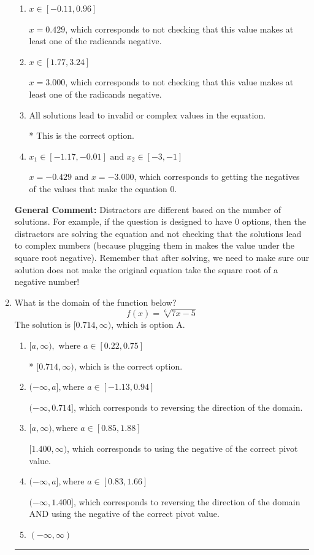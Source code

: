 \documentclass{extbook}[14pt]
\newcommand{\litem}[1]{\item #1

\rule{\textwidth}{0.4pt}}
\begin{document}
\begin{enumerate}
{\begin{enumerate}[label=\Alph*.]
$x = 0.429 \text{ and } x = 3.000$, which corresponds to not checking that BOTH values make at least one of the radicands negative.
\item \( x \in [-0.11,0.96] \)

$x = 0.429$, which corresponds to not checking that this value makes at least one of the radicands negative.
\item \( x \in [1.77,3.24] \)

$x = 3.000$, which corresponds to not checking that this value makes at least one of the radicands negative.
\item \( \text{All solutions lead to invalid or complex values in the equation.} \)

* This is the correct option.
\item \( x_1 \in [-1.17, -0.01] \text{ and } x_2 \in [-3,-1] \)

$x = -0.429 \text{ and } x = -3.000$, which corresponds to getting the negatives of the values that make the equation 0.
\end{enumerate}

\textbf{General Comment:} Distractors are different based on the number of solutions. For example, if the question is designed to have 0 options, then the distractors are solving the equation and not checking that the solutions lead to complex numbers (because plugging them in makes the value under the square root negative). Remember that after solving, we need to make sure our solution does not make the original equation take the square root of a negative number!
}
\litem{
What is the domain of the function below?
\[ f(x) = \sqrt[6]{7 x - 5} \]The solution is \( [0.714, \infty) \), which is option A.\begin{enumerate}[label=\Alph*.]
\item \( [a, \infty), \text{ where } a \in [0.22, 0.75] \)

* $[0.714, \infty)$, which is the correct option.
\item \( (-\infty, a], \text{where } a \in [-1.13, 0.94] \)

 $(-\infty, 0.714]$, which corresponds to reversing the direction of the domain.
\item \( [a, \infty), \text{where } a \in [0.85, 1.88] \)

$[1.400, \infty)$, which corresponds to using the negative of the correct pivot value.
\item \( (-\infty, a], \text{where } a \in [0.83, 1.66] \)

$(-\infty, 1.400]$, which corresponds to reversing the direction of the domain AND using the negative of the correct pivot value.
\item \( (-\infty, \infty) \)


\end{enumerate}}
\end{enumerate}
\end{document}
